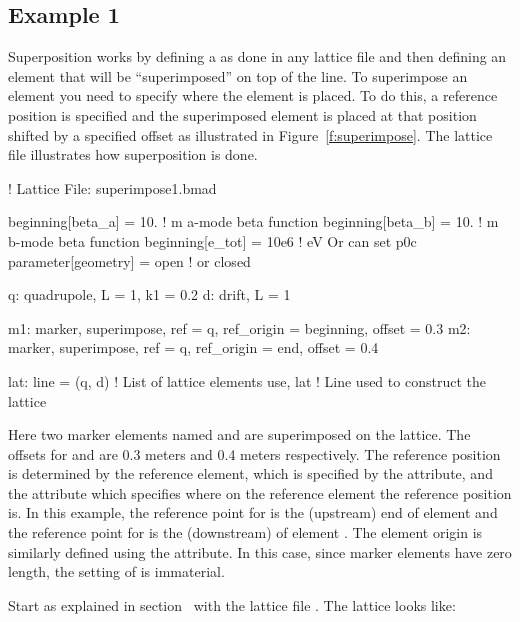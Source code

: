 \documentclass{hitec}     %
\begin{document}
{%
\subsection{Example 1}

Superposition works by defining a  as done in any lattice file and then defining an element
that will be ``superimposed'' on top of the line. To superimpose an element you need to specify
where the element is placed. To do this, a reference position is specified and the superimposed
element is placed at that position shifted by a specified offset as illustrated in
Figure~\ref{f:superimpose}. The lattice file  illustrates how superposition is
done.
\begin{code}
! Lattice File: superimpose1.bmad

beginning[beta_a] = 10.   ! m  a-mode beta function
beginning[beta_b] = 10.   ! m  b-mode beta function
beginning[e_tot] = 10e6   ! eV   Or can set p0c
parameter[geometry] = open      ! or closed

q: quadrupole, L = 1, k1 = 0.2
d: drift, L = 1

m1: marker, superimpose, ref = q, ref_origin = beginning, offset = 0.3
m2: marker, superimpose, ref = q, ref_origin = end, offset = 0.4

lat: line = (q, d)   ! List of lattice elements
use, lat             ! Line used to construct the lattice
\end{code}
Here two marker elements named  and  are superimposed on the lattice. The offsets for
 and  are 0.3 meters and 0.4 meters respectively. The reference position is determined
by the reference element, which is specified by the  attribute, and the 
attribute which specifies where on the reference element the reference position is. In this example,
the reference point for  is the  (upstream) end of element  and the
reference point for  is the (downstream)  of element . The element origin is
similarly defined using the  attribute. In this case, since marker elements have zero
length, the setting of  is immaterial.

Start \tao as explained in section~ with the lattice file
. The lattice looks like:

}
\end{document}
